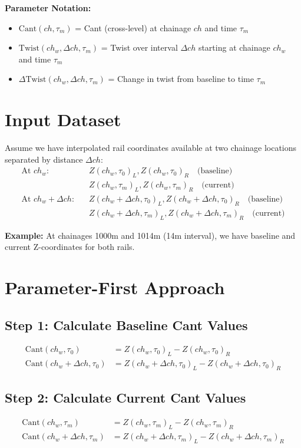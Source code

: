 \documentclass{article}
\begin{document}
\textbf{Parameter Notation:}
\begin{itemize}
\item $\text{Cant}(ch, \tau_m)$ = Cant (cross-level) at chainage $ch$ and time $\tau_m$
\item $\text{Twist}(ch_w, \Delta ch, \tau_m)$ = Twist over interval $\Delta ch$ starting at chainage $ch_w$ and time $\tau_m$
\item $\Delta\text{Twist}(ch_w, \Delta ch, \tau_m)$ = Change in twist from baseline to time $\tau_m$
\end{itemize}

\section{Input Dataset}
Assume we have interpolated rail coordinates available at two chainage locations separated by distance $\Delta ch$:
\begin{align}
\text{At } ch_w\text{:} \quad &Z(ch_w, \tau_0)_L, Z(ch_w, \tau_0)_R \quad \text{(baseline)} \\
&Z(ch_w, \tau_m)_L, Z(ch_w, \tau_m)_R \quad \text{(current)} \\[0.5em]
\text{At } ch_w + \Delta ch\text{:} \quad &Z(ch_w + \Delta ch, \tau_0)_L, Z(ch_w + \Delta ch, \tau_0)_R \quad \text{(baseline)} \\
&Z(ch_w + \Delta ch, \tau_m)_L, Z(ch_w + \Delta ch, \tau_m)_R \quad \text{(current)}
\end{align}

\textbf{Example:} At chainages 1000m and 1014m (14m interval), we have baseline and current Z-coordinates for both rails.

\section{Parameter-First Approach}

\subsection{Step 1: Calculate Baseline Cant Values}
\begin{align}
\text{Cant}(ch_w, \tau_0) &= Z(ch_w, \tau_0)_L - Z(ch_w, \tau_0)_R \\
\text{Cant}(ch_w + \Delta ch, \tau_0) &= Z(ch_w + \Delta ch, \tau_0)_L - Z(ch_w + \Delta ch, \tau_0)_R
\end{align}

\subsection{Step 2: Calculate Current Cant Values}
\begin{align}
\text{Cant}(ch_w, \tau_m) &= Z(ch_w, \tau_m)_L - Z(ch_w, \tau_m)_R \\
\text{Cant}(ch_w + \Delta ch, \tau_m) &= Z(ch_w + \Delta ch, \tau_m)_L - Z(ch_w + \Delta ch, \tau_m)_R
\end{align}
\end{document}
